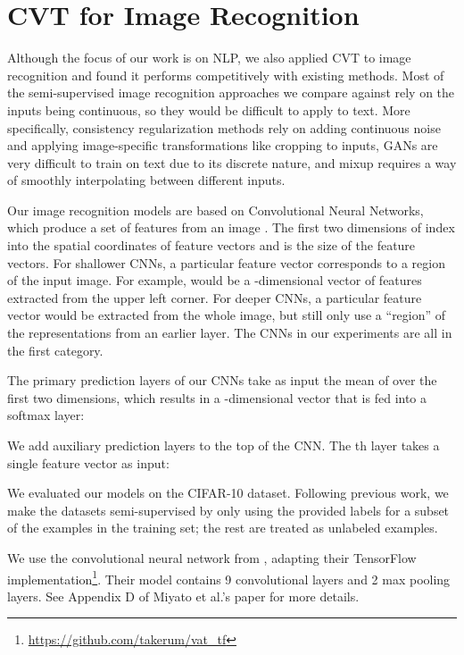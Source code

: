 \documentclass[11pt,a4paper]{article}
\newcommand{\xhdr}[1]{\vspace{1.7mm}\noindent{{\bf #1.}}}
\begin{document}
\section{CVT for Image Recognition}
\label{sec:img}

Although the focus of our work is on NLP, we also applied CVT to image recognition and found it performs competitively with existing methods. Most of the semi-supervised image recognition approaches we compare against rely on the inputs being continuous, so they would be difficult to apply to text. More specifically, consistency regularization methods \citep{sajjadi2016regularization, laine2016temporal, miyato2017virtual} rely on adding continuous noise and applying image-specific transformations like cropping to inputs, GANs \citep{salimans2016improved, wei2018improving} are very difficult to train on text due to its discrete nature, and mixup \citep{zhang2017mixup, verma2018manifold} requires a way of smoothly interpolating between different inputs. 

\xhdr{Approach}
Our image recognition models are based on Convolutional Neural Networks, which produce a set of features  from an image .
The first two dimensions of  index into the spatial coordinates of feature vectors and  is the size of the feature vectors.
For shallower CNNs, a particular feature vector corresponds to a region of the input image.
For example,  would be a -dimensional vector of features extracted from the upper left corner.
For deeper CNNs, a particular feature vector would be extracted from the whole image, but still only use a ``region'' of the representations from an earlier layer.
The CNNs in our experiments are all in the first category.

The primary prediction layers of our CNNs take as input the mean of  over the first two dimensions, which results in a -dimensional vector that is fed into a softmax layer:


We add  auxiliary prediction layers to the top of the CNN. The th layer takes a single feature vector as input:


\xhdr{Data}
We evaluated our models on the CIFAR-10 \citep{krizhevsky2009learning} dataset. 
Following previous work, we make the datasets semi-supervised by only using the provided labels for a subset of the examples in the training set; the rest are treated as unlabeled examples.

\xhdr{Model} We use the convolutional neural network from \citet{miyato2017virtual}, adapting their TensorFlow implementation\footnote{\url{https://github.com/takerum/vat_tf}}.
Their model contains 9 convolutional layers and 2 max pooling layers. See Appendix D of Miyato et al.'s paper for more details.
\end{document}
